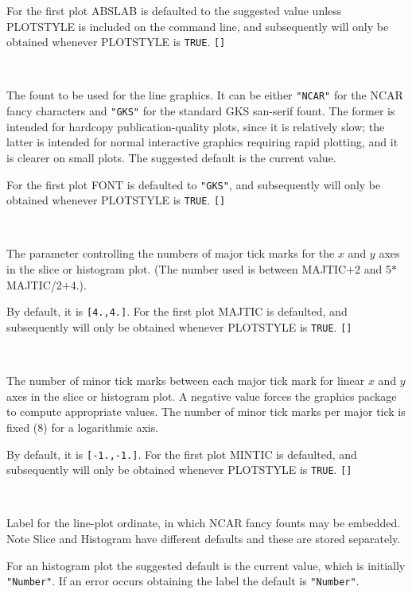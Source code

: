 \documentclass[twoside,11pt]{article}
\newcommand{\sstsubsection}[1]{ \item[{#1}] \mbox{} \\}
\newcommand{\sstsubsection}[1]{\item[{#1}]}
\begin{document}
{{{         For the first plot ABSLAB is defaulted to the suggested value
         unless PLOTSTYLE is included on the command line, and
         subsequently will only be obtained whenever PLOTSTYLE is {\tt TRUE}.
         {\tt []}
      }
      \sstsubsection{
         FONT = LITERAL (Read)
      }{
         The fount to be used for the line graphics.  It can be either
         {\tt "NCAR"} for the NCAR fancy characters and {\tt "GKS"} for the standard
         GKS san-serif fount.   The former is intended for hardcopy
         publication-quality plots, since it is relatively slow; the
         latter is intended for normal interactive graphics requiring
         rapid plotting, and it is clearer on small plots. The
         suggested default is the current value.

         For the first plot FONT is defaulted to {\tt "GKS"}, and subsequently
         will only be obtained whenever PLOTSTYLE is {\tt TRUE}. {\tt []}
      }
      \sstsubsection{
         MAJTIC( 2 ) = \_REAL (Read)
      }{
         The parameter controlling the numbers of major tick marks
         for the $x$ and $y$ axes in the slice or histogram plot.
         (The number used is between MAJTIC$+$2 and 5$*$MAJTIC/2$+$4.).

         By default, it is {\tt [4.,4.]}.  For the first plot MAJTIC is
         defaulted, and subsequently will only be obtained whenever
         PLOTSTYLE is {\tt TRUE}.  {\tt []}
      }
      \sstsubsection{
         MINTIC( 2 ) = \_REAL (Read)
      }{
         The number of minor tick marks between each major tick mark
         for linear $x$ and $y$ axes in the slice or histogram plot.  A
         negative value forces the graphics package to compute
         appropriate values.  The number of minor tick marks per major
         tick is fixed (8) for a logarithmic axis.

         By default, it is {\tt [-1.,-1.]}.  For the first plot MINTIC is
         defaulted, and subsequently will only be obtained whenever
         PLOTSTYLE is {\tt TRUE}.  {\tt []}
      }
      \sstsubsection{
         ORDLAB  =  LITERAL (Read)
      }{
         Label for the line-plot ordinate, in which NCAR fancy founts
         may be embedded.  Note Slice and Histogram have different
         defaults and these are stored separately.

         For an histogram plot the suggested default is the current
         value, which is initially {\tt "Number"}.  If an error occurs
         obtaining the label the default is {\tt "Number"}.

}}}
\end{document}
